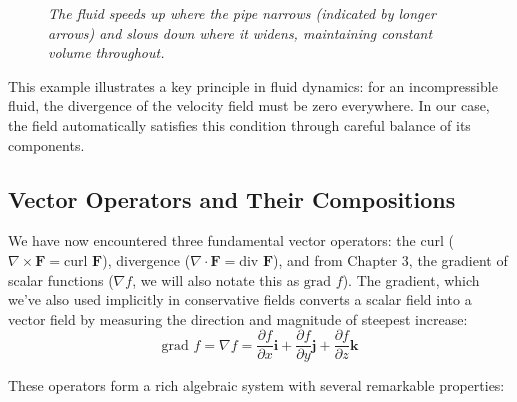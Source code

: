 \begin{example}
\begin{solution}
\begin{figure}[H]
\caption{\textit{The fluid speeds up where the pipe narrows (indicated by longer arrows) and slows down where it widens, maintaining constant volume throughout.}}
\label{fig:pipe_flow}
\end{figure}

\noindent This example illustrates a key principle in fluid dynamics: for an incompressible fluid, the divergence of the velocity field must be zero everywhere. In our case, the field automatically satisfies this condition through careful balance of its components.

\end{solution}
\end{example}
\exampleline

\subsection*{Vector Operators and Their Compositions} 

\noindent We have now encountered three fundamental vector operators: the curl ($\nabla \times \mathbf{F} = \text{curl } \mathbf{F}$), divergence ($\nabla \cdot \mathbf{F} = \text{div } \mathbf{F}$), and from Chapter 3, the gradient of scalar functions ($\nabla f$, we will also notate this as $\text{grad } f$). The gradient, which we've also used implicitly in conservative fields converts a scalar field into a vector field by measuring the direction and magnitude of steepest increase:
\[
\text{grad }f = \nabla f = \frac{\partial f}{\partial x}\mathbf{i} + \frac{\partial f}{\partial y}\mathbf{j} + \frac{\partial f}{\partial z}\mathbf{k}
\]

\noindent These operators form a rich algebraic system with several remarkable properties:

